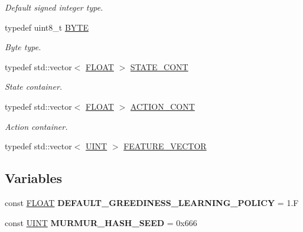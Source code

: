 \begin{DoxyCompactItemize}
\begin{DoxyCompactList}\small\item\em Default signed integer type. \end{DoxyCompactList}\item 
\hypertarget{namespaceAI_a9d4bcda82fe0f9aac3c4861e24491581}{typedef uint8\-\_\-t \hyperlink{namespaceAI_a9d4bcda82fe0f9aac3c4861e24491581}{B\-Y\-T\-E}}\label{namespaceAI_a9d4bcda82fe0f9aac3c4861e24491581}

\begin{DoxyCompactList}\small\item\em Byte type. \end{DoxyCompactList}\item 
\hypertarget{namespaceAI_aff63ec21d97dd5f086fddbc3103f5707}{typedef std\-::vector$<$ \hyperlink{namespaceAI_a41b74884a20833db653dded3918e05c3}{F\-L\-O\-A\-T} $>$ \hyperlink{namespaceAI_aff63ec21d97dd5f086fddbc3103f5707}{S\-T\-A\-T\-E\-\_\-\-C\-O\-N\-T}}\label{namespaceAI_aff63ec21d97dd5f086fddbc3103f5707}

\begin{DoxyCompactList}\small\item\em State container. \end{DoxyCompactList}\item 
\hypertarget{namespaceAI_a143ffd7216e2cf8fc6d92e4efdb647a7}{typedef std\-::vector$<$ \hyperlink{namespaceAI_a41b74884a20833db653dded3918e05c3}{F\-L\-O\-A\-T} $>$ \hyperlink{namespaceAI_a143ffd7216e2cf8fc6d92e4efdb647a7}{A\-C\-T\-I\-O\-N\-\_\-\-C\-O\-N\-T}}\label{namespaceAI_a143ffd7216e2cf8fc6d92e4efdb647a7}

\begin{DoxyCompactList}\small\item\em Action container. \end{DoxyCompactList}\item 
typedef std\-::vector$<$ \hyperlink{namespaceAI_ab6e14dc1e659854858a87e511f1439ec}{U\-I\-N\-T} $>$ \hyperlink{namespaceAI_a23a39e1b301a5c1345fa508796940631}{F\-E\-A\-T\-U\-R\-E\-\_\-\-V\-E\-C\-T\-O\-R}
\end{DoxyCompactItemize}
\subsection*{Variables}
\begin{DoxyCompactItemize}
\item 
\hypertarget{namespaceAI_a939c510628efeee2f78c708718653f19}{const \hyperlink{namespaceAI_a41b74884a20833db653dded3918e05c3}{F\-L\-O\-A\-T} {\bfseries D\-E\-F\-A\-U\-L\-T\-\_\-\-G\-R\-E\-E\-D\-I\-N\-E\-S\-S\-\_\-\-L\-E\-A\-R\-N\-I\-N\-G\-\_\-\-P\-O\-L\-I\-C\-Y} = 1.\-F}\label{namespaceAI_a939c510628efeee2f78c708718653f19}

\item 
\hypertarget{namespaceAI_a8909739449117cea825e57ded425e597}{const \hyperlink{namespaceAI_ab6e14dc1e659854858a87e511f1439ec}{U\-I\-N\-T} {\bfseries M\-U\-R\-M\-U\-R\-\_\-\-H\-A\-S\-H\-\_\-\-S\-E\-E\-D} = 0x666}\label{namespaceAI_a8909739449117cea825e57ded425e597}

\end{DoxyCompactItemize}


